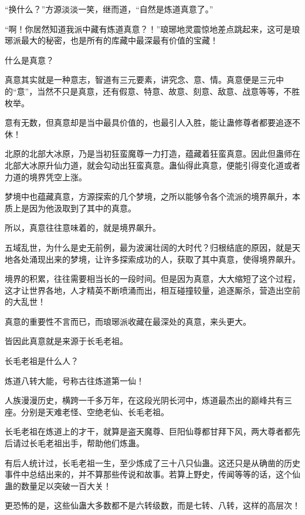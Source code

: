 
\begin{this_body}



“换什么？”方源淡淡一笑，继而道，“自然是炼道真意了。”

“啊！你居然知道我派中藏有炼道真意？！”琅琊地灵震惊地差点跳起来，这可是琅琊派最大的秘密，也是所有的库藏中最深最有价值的宝藏！

什么是真意？

真意其实就是一种意志，智道有三元要素，讲究念、意、情。真意便是三元中的“意”，当然不只是真意，还有假意、特意、故意、刻意、敌意、战意等等，不胜枚举。

意有无数，但真意却是当中最具价值的，也最引人入胜，能让蛊修尊者都要追逐不休！

北原的北部大冰原，乃是当初狂蛮魔尊一力打造，蕴藏着狂蛮真意。因此但蛊师在北部大冰原升仙力道，就会勾动出狂蛮真意。蛊仙得此真意，便能引得变化道或者力道的境界凭空上涨。

梦境中也蕴藏真意，方源探索的几个梦境，之所以能够令各个流派的境界飙升，本质上是因为他汲取到了其中的真意。

所以，真意往往意味着的，就是境界飙升。

五域乱世，为什么是史无前例，最为波澜壮阔的大时代？归根结底的原因，就是天地各处涌现出来的梦境，让许多探索成功的人，获取了其中真意，使得境界飙升。

境界的积累，往往需要相当长的一段时间。但是因为真意，大大缩短了这个过程，这才让世界各地，人才精英不断喷涌而出，相互碰撞较量，追逐厮杀，营造出空前的大乱世！

真意的重要性不言而已，而琅琊派收藏在最深处的真意，来头更大。

皆因此真意就是来源于长毛老祖。

长毛老祖是什么人？

炼道八转大能，号称古往炼道第一仙！

人族漫漫历史，横跨一千多万年，在这段光阴长河中，炼道最杰出的巅峰共有三座。分别是天难老怪、空绝老仙、长毛老祖。

长毛老祖在炼道上的才干，就算是盗天魔尊、巨阳仙尊都甘拜下风，两大尊者都先后请过长毛老祖出手，帮助他们炼蛊。

有后人统计过，长毛老祖一生，至少炼成了三十八只仙蛊。这还只是从确凿的历史事件中总结出来的，并不算那些传说和故事。若算上野史，传闻等等的话，这个仙蛊的数量足以突破一百大关！

更恐怖的是，这些仙蛊大多数都不是六转级数，而是七转、八转，这样的高层次！


\end{this_body}

